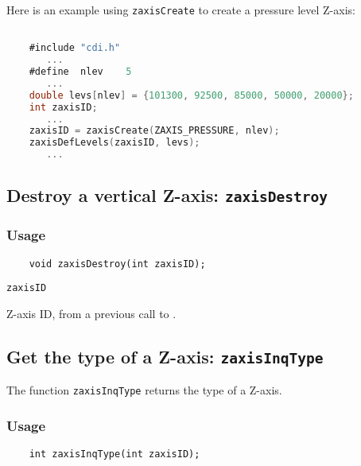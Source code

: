 Here is an example using {\tt zaxisCreate} to create a pressure level Z-axis:

\begin{lstlisting}[language=C, backgroundcolor=\color{pyellow}, basicstyle=\small, columns=flexible]

    #include "cdi.h"
       ...
    #define  nlev    5
       ...
    double levs[nlev] = {101300, 92500, 85000, 50000, 20000};
    int zaxisID;
       ...
    zaxisID = zaxisCreate(ZAXIS_PRESSURE, nlev);
    zaxisDefLevels(zaxisID, levs);
       ...
\end{lstlisting}


\subsection{Destroy a vertical Z-axis: {\tt zaxisDestroy}}
\label{zaxisDestroy}
\subsubsection*{Usage}

\begin{verbatim}
    void zaxisDestroy(int zaxisID);
\end{verbatim}

\hspace*{4mm}\begin{minipage}[]{15cm}
\begin{deflist}{\tt zaxisID\ }
\item[{\tt zaxisID}]
Z-axis ID, from a previous call to {}.

\end{deflist}
\end{minipage}


\subsection{Get the type of a Z-axis: {\tt zaxisInqType}}
\label{zaxisInqType}

The function {\tt zaxisInqType} returns the type of a Z-axis.

\subsubsection*{Usage}

\begin{verbatim}
    int zaxisInqType(int zaxisID);
\end{verbatim}

